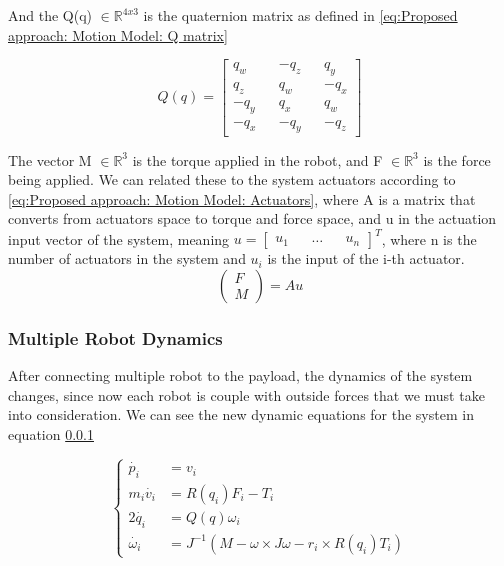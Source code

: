 And the Q(q) $\in \mathbb{R}^{4x3}$ is the quaternion matrix as defined in \ref{eq:Proposed approach: Motion Model: Q matrix}

\begin{equation}
    Q\left(q\right) = 
    \begin{bmatrix}
        q_w && -q_z && q_y \\
        q_z && q_w && -q_x \\
        -q_y && q_x && q_w \\
        -q_x && -q_y && -q_z
    \end{bmatrix}
    \label{eq:Proposed approach: Motion Model: Q matrix}
\end{equation}

The vector M $\in \mathbb{R}^{3}$ is the torque applied in the robot, and F $\in \mathbb{R}^3$ is the force being applied. We can related these to the system actuators according to \ref{eq:Proposed approach: Motion Model: Actuators}, where A is a matrix that converts from actuators space to torque and force space, and u in the actuation input vector of the system, meaning $u = \begin{bmatrix} u_{1} && \dots && u_{n} \end{bmatrix}^{T}$, where n is the number of actuators in the system and $u_{i}$ is the input of the i-th actuator. 
\begin{equation}
    \begin{pmatrix}
        F \\
        M
    \end{pmatrix} = A u
    \label{eq:Proposed approach: Motion Model: Actuators}
\end{equation}

\subsubsection{Multiple Robot Dynamics}
After connecting multiple robot to the payload, the dynamics of the system changes, since now each robot is couple with outside forces that we must take into consideration. We can see the new dynamic equations for the system in equation \ref{}

\begin{equation}
\begin{cases}
\dot{p_i} &= v_{i} \\
m_i \dot{v_i} &= R(q_i)F_i - T_i \\
2\dot{q_i} &= Q(q) \omega_i \\
\dot{\omega_i} &=J^{-1}(M - \omega \times J \omega - r_i \times R(q_i)T_i)
\end{cases}
\label{eq:Proposed Approach:Motion Model: Multiple Robot Dynamics: Robot Dynamics}
\end{equation}